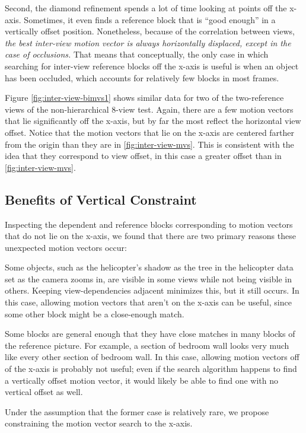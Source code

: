 \documentclass{sig-alternate-05-2015}
\begin{document}
\newpage
Second, the diamond refinement spends a lot of time looking at points off
the x-axis. Sometimes, it even finds a reference block that is ``good enough''
in a vertically offset position. Nonetheless, because of the correlation between
views, {\it the best inter-view motion vector is always horizontally displaced,
except in the case of occlusions.} That means that conceptually, the only case in
which searching for inter-view reference blocks off the x-axis is useful is when
an object has been occluded, which accounts for relatively few blocks in most
frames.

Figure \ref{fig:inter-view-bimvs1} shows similar data for two of the
two-reference views of the non-hierarchical 8-view test. Again, there are a few
motion vectors that lie significantly off the x-axis, but by far the most reflect
the horizontal view offset. Notice that the motion vectors that lie on the x-axis
are centered farther from the origin than they are in \ref{fig:inter-view-mvs}.
This is consistent with the idea that they correspond to view offset, in this
case a greater offset than in \ref{fig:inter-view-mvs}.

\subsection{Benefits of Vertical Constraint}
\label{subsec:constrained}
Inspecting the dependent and reference blocks corresponding to motion vectors
that do not lie on the x-axis, we found that there are two primary reasons these
unexpected motion vectors occur: \begin{compactitem}
\item Some objects, such as the helicopter's shadow as the tree in the helicopter
data set as the camera zooms in, are visible in some views while not being visible
in others. Keeping view-dependencies adjacent minimizes this, but it still occurs.
In this case, allowing motion vectors that aren't on the x-axis can be useful,
since some other block might be a close-enough match.
\item Some blocks are general enough that they have close matches in many blocks
of the reference picture. For example, a section of bedroom wall looks very much
like every other section of bedroom wall. In this case, allowing motion vectors
off of the x-axis is probably not useful; even if the search algorithm happens
to find a vertically offset motion vector, it would likely be able to find one
with no vertical offset as well. \end{compactitem} Under the assumption that the
former case is relatively rare, we propose constraining the motion vector search
to the x-axis.
\end{document}
